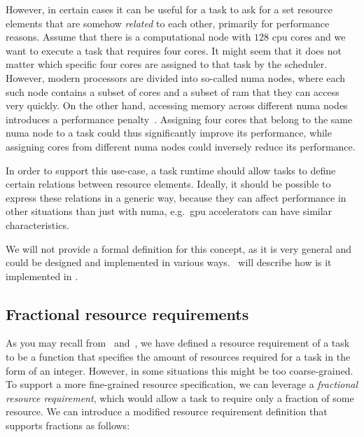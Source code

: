 However, in certain cases it can be useful for a task to ask for a set resource elements that
are somehow \emph{related} to each other, primarily for performance reasons. Assume that there is a
computational node with $128$ \gls{cpu} cores and we want to execute a task that requires four
cores. It might seem that it does not matter which specific four cores are assigned to that task by
the scheduler. However, modern processors are divided into so-called \gls{numa} nodes, where
each such node contains a subset of cores and a subset of \gls{ram} that they can access very
quickly. On the other hand, accessing memory across different \gls{numa} nodes introduces a
performance penalty~\cite{numa_effect}. Assigning four cores that belong to the same \gls{numa}
node to a task could thus significantly improve its performance, while assigning cores from
different \gls{numa} nodes could inversely reduce its performance.

In order to support this use-case, a task runtime should allow tasks to define certain relations
between resource elements. Ideally, it should be possible to express these relations in a
generic way, because they can affect performance in other situations than just with \gls{numa},
e.g.\ \gls{gpu} accelerators can have similar characteristics.

We will not provide a formal definition for this concept, as it is very general and could be
designed and implemented in various ways.~ will describe how
is it implemented in \hyperqueue{}.

\subsection{Fractional resource requirements}
As you may recall from~ and~, we have defined a resource
requirement of a task to be a function that specifies the amount of resources required for a
task in the form of an integer. However, in some situations this might be too coarse-grained. To
support a more fine-grained resource specification, we can leverage a
\emph{fractional resource requirement}, which would allow a task to require only a fraction of some
resource. We can introduce a modified resource requirement definition that supports fractions
 as follows:



